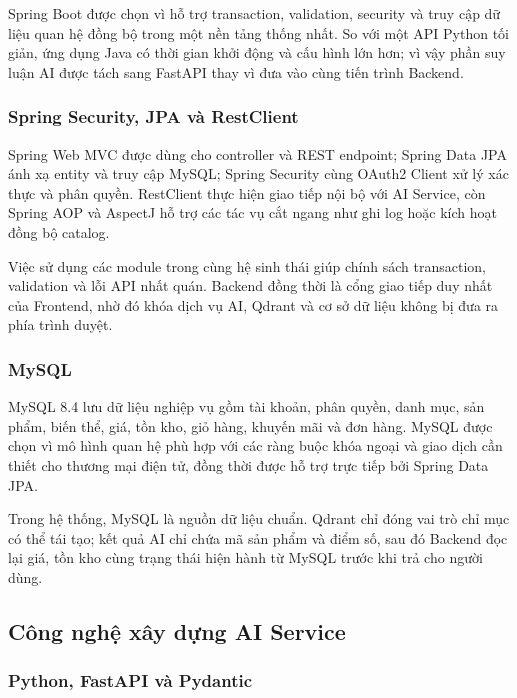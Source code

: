 Spring Boot được chọn vì hỗ trợ transaction, validation, security và truy cập dữ liệu quan hệ đồng bộ trong một nền tảng thống nhất. So với một API Python tối giản, ứng dụng Java có thời gian khởi động và cấu hình lớn hơn; vì vậy phần suy luận AI được tách sang FastAPI thay vì đưa vào cùng tiến trình Backend.

\subsubsection{Spring Security, JPA và RestClient}

Spring Web MVC được dùng cho controller và REST endpoint; Spring Data JPA ánh xạ entity và truy cập MySQL; Spring Security cùng OAuth2 Client xử lý xác thực và phân quyền. RestClient thực hiện giao tiếp nội bộ với AI Service, còn Spring AOP và AspectJ hỗ trợ các tác vụ cắt ngang như ghi log hoặc kích hoạt đồng bộ catalog.

Việc sử dụng các module trong cùng hệ sinh thái giúp chính sách transaction, validation và lỗi API nhất quán. Backend đồng thời là cổng giao tiếp duy nhất của Frontend, nhờ đó khóa dịch vụ AI, Qdrant và cơ sở dữ liệu không bị đưa ra phía trình duyệt.

\subsubsection{MySQL}

MySQL 8.4 lưu dữ liệu nghiệp vụ gồm tài khoản, phân quyền, danh mục, sản phẩm, biến thể, giá, tồn kho, giỏ hàng, khuyến mãi và đơn hàng. MySQL được chọn vì mô hình quan hệ phù hợp với các ràng buộc khóa ngoại và giao dịch cần thiết cho thương mại điện tử, đồng thời được hỗ trợ trực tiếp bởi Spring Data JPA.

Trong hệ thống, MySQL là nguồn dữ liệu chuẩn. Qdrant chỉ đóng vai trò chỉ mục có thể tái tạo; kết quả AI chỉ chứa mã sản phẩm và điểm số, sau đó Backend đọc lại giá, tồn kho cùng trạng thái hiện hành từ MySQL trước khi trả cho người dùng.

\subsection{Công nghệ xây dựng AI Service}

\subsubsection{Python, FastAPI và Pydantic}

